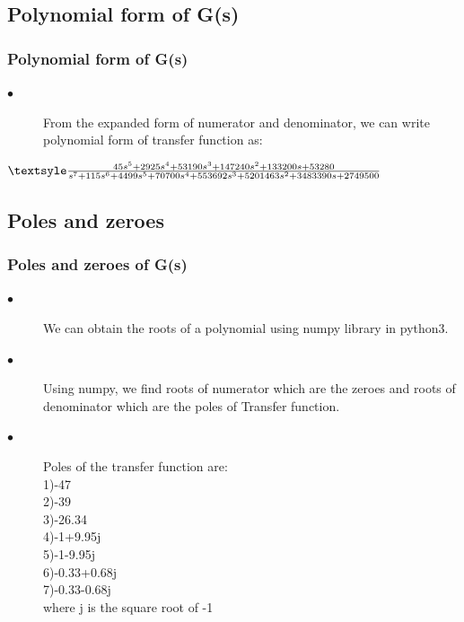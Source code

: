 \documentclass{beamer}
\theoremstyle{remark}
\begin{document}
\subsection{Polynomial form of G(s)}
\begin{frame}
\frametitle{Polynomial form of G(s)}
\begin{enumerate}[label=(\roman*)]
\begin{description}
    \item[$\bullet$]From the expanded form of numerator and denominator, we can write polynomial form of transfer function as:
\end{description}

\vspace{0.2 in}
\noindent 
 $ {\textsyle \frac{45s^5+2925s^4+53190s^3+147240s^2+133200s+53280}{s^7+115s^6+4499s^5+70700s^4+553692s^3+5201463s^2+3483390s+2749500}} $\\
\noindent
\vspace{0.1 in}

\end{enumerate}
\end{frame}











\subsection{Poles and zeroes}
\begin{frame}
\frametitle{Poles and zeroes of G(s)}
\begin{description}
\item[$\bullet$]We can obtain the roots of a polynomial using numpy library in python3.
\item[$\bullet$]Using numpy, we find roots of numerator which are the zeroes and roots of denominator which are the poles of Transfer function.
\item[$\bullet$]Poles of the transfer function are:\\
1)-47\\
2)-39\\
3)-26.34\\
4)-1+9.95j\\
5)-1-9.95j\\
6)-0.33+0.68j\\
7)-0.33-0.68j\\
\vspace{0.1 in}
where j is the square root of -1
\end{description}
\end{frame}
\end{document}
